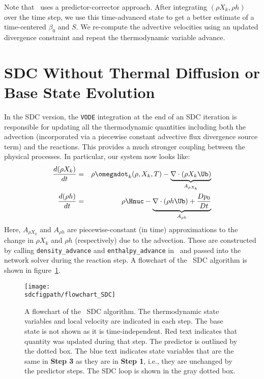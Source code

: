 Note that \maestro\ uses a predictor-corrector approach.  After integrating $(\rho X_k,\rho h)$ over
the time step, we use this time-advanced state to get a better estimate of a time-centered $\beta_0$
and $S$.  We re-compute the advective velocities using an updated divergence constraint and repeat 
the thermodynamic variable advance.

\section{SDC Without Thermal Diffusion or Base State Evolution}
In the SDC version, the {\tt VODE} integration at the end of an SDC
iteration is responsible for updating all the thermodynamic quantities
including both the advection (incorporated via a piecewise constant advective 
flux divergence source term) and the reactions.  This provides a much stronger coupling between
the physical processes.  In particular, our system now looks like:
\begin{eqnarray}
\frac{d(\rho X_k)}{dt} &=& \rho \omegadot_k(\rho,X_k,T) - \underbrace{\nabla\cdot(\rho X_k\Ub)}_{A_{\rho X_k}}\label{eq:sdc:rhoX} \\
\frac{d(\rho h)}{dt}   &=& \rho \Hnuc - \underbrace{\nabla\cdot(\rho h\Ub) + \frac{Dp_0}{Dt}}_{A_{\rho h}} \label{eq:sdc:rhoh}
\end{eqnarray}
Here, $A_{\rho X_k}$ and $A_{\rho h}$ are piecewise-constant (in time)
approximations to the change in ${\rho X_k}$ and ${\rho h}$ (respectively)
due to the advection.  These are constructed by calling {\tt density\_advance}
and {\tt enthalpy\_advance} in \maestro\ and passed into the network solver
during the reaction step.  A flowchart of the \maestro\ SDC algorithm is 
shown in figure~\ref{fig:sdc:flowchart}.

\begin{figure}[tb]
\centering
\texttt{[image: \\sdcfigpath/flowchart\_SDC]}
\caption[Graphical flowchart of \maestro\ SDC]
  {\label{fig:sdc:flowchart} A flowchart of the \maestro\ SDC algorithm.  The
  thermodynamic state variables and local velocity are
  indicated in each step.  The base state is not shown as it is time-independent.
  Red text indicates that quantity was
  updated during that step.  The predictor is 
  outlined by the dotted box.  The blue text indicates state
  variables that are the same in {\bf Step 3} as they are in
  {\bf Step 1}, i.e., they are unchanged by the predictor steps.
  The SDC loop is shown in the gray dotted box.}
\end{figure}


